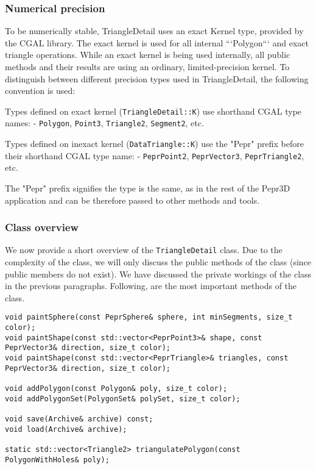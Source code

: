\subsubsection{Numerical precision}

To be numerically stable, TriangleDetail uses an exact Kernel type, provided by the CGAL library. The exact kernel is used for all internal ```Polygon``` and exact triangle operations. While an exact kernel is being used internally, all public methods and their results are using an ordinary, limited-precision kernel. To distinguish between different precision types used in TriangleDetail, the following convention is used:

Types defined on exact kernel (\texttt{TriangleDetail::K}) use shorthand CGAL type names:
- \texttt{Polygon}, \texttt{Point3}, \texttt{Triangle2}, \texttt{Segment2}, etc.

Types defined on inexact kernel (\texttt{DataTriangle::K}) use the "Pepr" prefix before their shorthand CGAL type name:
- \texttt{PeprPoint2}, \texttt{PeprVector3}, \texttt{PeprTriangle2}, etc.

The "Pepr" prefix signifies the type is the same, as in the rest of the Pepr3D application and can be therefore passed to other methods and tools.

\subsubsection{Class overview}

We now provide a short overview of the \texttt{TriangleDetail} class. Due to the complexity of the class, we will only discuss the public methods of the class (since public members do not exist). We have discussed the private workings of the class in the previous paragraphs. Following, are the most important methods of the class.

\begin{lstlisting}
void paintSphere(const PeprSphere& sphere, int minSegments, size_t color);
void paintShape(const std::vector<PeprPoint3>& shape, const PeprVector3& direction, size_t color);
void paintShape(const std::vector<PeprTriangle>& triangles, const PeprVector3& direction, size_t color);

void addPolygon(const Polygon& poly, size_t color);
void addPolygonSet(PolygonSet& polySet, size_t color);

void save(Archive& archive) const;
void load(Archive& archive);

static std::vector<Triangle2> triangulatePolygon(const PolygonWithHoles& poly);
\end{lstlisting}

